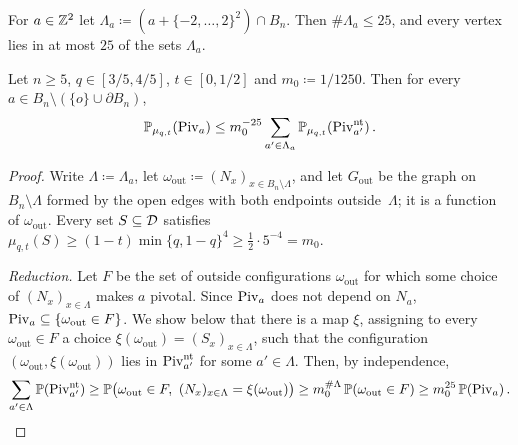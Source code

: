 \documentclass[11pt,letterpaper]{article}
\begin{document}
For $a\in\mathbb Z^2$ let $\Lambda_a\coloneqq(a+\{-2,\dots,2\}^2)\cap B_n$. Then $\#\Lambda_a\le25$, and every vertex lies in at most $25$ of the sets $\Lambda_a$.

\begin{lemma}\label{lem:surgery}
Let $n\ge5$, $q\in[3/5,4/5]$, $t\in[0,1/2]$ and $m_0\coloneqq1/1250$. Then for every $a\in B_n\setminus(\{o\}\cup\partial B_n)$,
\begin{equation*}
\mathbb P_{\mu_{q,t}}(\mathrm{Piv}_a)\le m_0^{-25}\sum_{a'\in\Lambda_a}\mathbb P_{\mu_{q,t}}(\mathrm{Piv}^{\mathrm{nt}}_{a'})\,.
\end{equation*}
\end{lemma}

\begin{proof}
Write $\Lambda\coloneqq\Lambda_a$, let $\omega_{\mathrm{out}}\coloneqq(N_x)_{x\in B_n\setminus\Lambda}$, and let $G_{\mathrm{out}}$ be the graph on $B_n\setminus\Lambda$ formed by the open edges with both endpoints outside~$\Lambda$; it is a function of $\omega_{\mathrm{out}}$. Every set $S\subseteq\mathcal D$ satisfies $\mu_{q,t}(S)\ge(1-t)\min\{q,1-q\}^4\ge\frac12\cdot5^{-4}=m_0$.

\emph{Reduction.} Let $F$ be the set of outside configurations $\omega_{\mathrm{out}}$ for which some choice of $(N_x)_{x\in\Lambda}$ makes $a$ pivotal. Since $\mathrm{Piv}_a$ does not depend on $N_a$, $\mathrm{Piv}_a\subseteq\{\omega_{\mathrm{out}}\in F\}$. We show below that there is a map $\xi$, assigning to every $\omega_{\mathrm{out}}\in F$ a choice $\xi(\omega_{\mathrm{out}})=(S_x)_{x\in\Lambda}$, such that the configuration $(\omega_{\mathrm{out}},\xi(\omega_{\mathrm{out}}))$ lies in $\mathrm{Piv}_{a'}^{\mathrm{nt}}$ for some $a'\in\Lambda$. Then, by independence,
\begin{equation*}
\sum_{a'\in\Lambda}\mathbb P(\mathrm{Piv}^{\mathrm{nt}}_{a'})\ge\mathbb P\big(\omega_{\mathrm{out}}\in F,\ (N_x)_{x\in\Lambda}=\xi(\omega_{\mathrm{out}})\big)\ge m_0^{\#\Lambda}\,\mathbb P(\omega_{\mathrm{out}}\in F)\ge m_0^{25}\,\mathbb P(\mathrm{Piv}_a)\,.
\end{equation*}


\end{proof}
\end{document}
